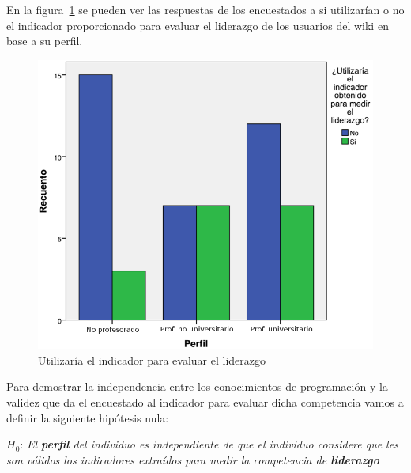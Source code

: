 En la figura~\ref{fig:app:barras:perfil:liderazgo} se pueden ver las respuestas de los encuestados a si utilizarían o no el indicador proporcionado para evaluar el liderazgo de los usuarios del wiki en base a su perfil.

\begin{figure}
  \begin{center}
    \includegraphics[scale=0.3]{barras_perfil_liderazgo.png}
  \end{center}
  \caption{Utilizaría el indicador para evaluar el liderazgo}
  \label{fig:app:barras:perfil:liderazgo}
\end{figure}

Para demostrar la independencia entre los conocimientos de programación y la validez que da el encuestado al indicador para evaluar dicha competencia vamos a definir la siguiente hipótesis nula:

\begin{mdframed}[style=hipotesis0]
$H_0$: \emph{El \textbf{perfil} del individuo es independiente de que el individuo considere que les son válidos los indicadores extraídos para medir la competencia de \textbf{liderazgo}}
\end{mdframed}


